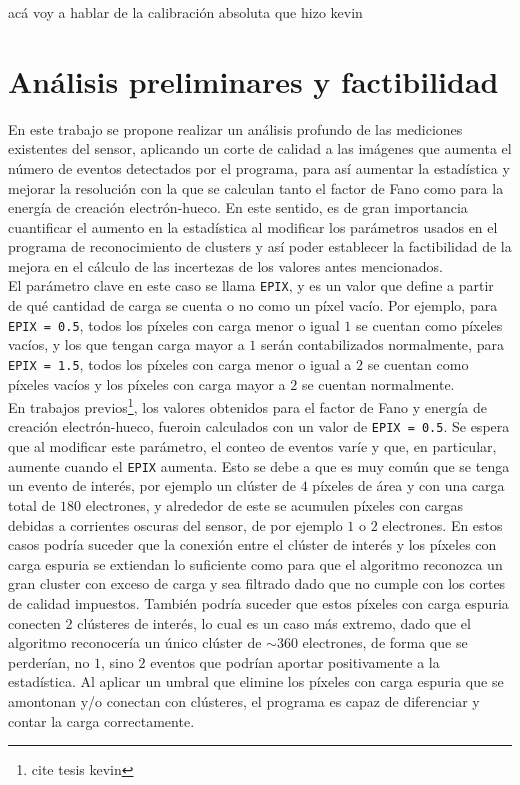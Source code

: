 acá voy a hablar de la calibración absoluta que hizo kevin




\chapter{Análisis preliminares y factibilidad}
\noindent En este trabajo se propone realizar un análisis profundo de las mediciones existentes del sensor, aplicando un corte de calidad a las imágenes que aumenta el número de eventos detectados por el programa, para así aumentar la estadística y mejorar la resolución con la que se calculan tanto el factor de Fano como para la energía de creación electrón-hueco. %
En este sentido, es de gran importancia cuantificar el aumento en la estadística al modificar los parámetros usados en el programa de reconocimiento de clusters y así poder establecer la factibilidad de la mejora en el cálculo de las incertezas de los valores antes mencionados.\\
\indent El parámetro clave en este caso se llama \verb|EPIX|, y es un valor que define a partir de qué cantidad de carga se cuenta o no como un píxel vacío. Por ejemplo, para \verb|EPIX = 0.5|, todos los píxeles con carga menor o igual $1$ se cuentan como píxeles vacíos, y los que tengan carga mayor a $1$ serán contabilizados normalmente, para \verb|EPIX = 1.5|, todos los píxeles con carga menor o igual a $2$ se cuentan como píxeles vacíos y los píxeles con carga mayor a $2$ se cuentan normalmente.\\
\indent En trabajos previos\footnote{cite tesis kevin}, los valores obtenidos para el factor de Fano y energía de creación electrón-hueco, fueroin calculados con un valor de \verb|EPIX = 0.5|. Se espera que al modificar este parámetro, el conteo de eventos varíe y que, en particular, aumente cuando el \verb|EPIX| aumenta. Esto se debe a que es muy común que se tenga un evento de interés, por ejemplo un clúster de $4$ píxeles de área y con una carga total de $180$ electrones, y alrededor de este se acumulen píxeles con cargas debidas a corrientes oscuras del sensor, de por ejemplo $1$ o $2$ electrones. En estos casos podría suceder que la conexión entre el clúster de interés y los píxeles con carga espuria se extiendan lo suficiente como para que el algoritmo reconozca un gran cluster con exceso de carga y sea filtrado dado que no cumple con los cortes de calidad impuestos. También podría suceder que estos píxeles con carga espuria conecten $2$ clústeres de interés, lo cual es un caso más extremo, dado que el algoritmo reconocería un único clúster de $\sim 360$ electrones, de forma que se perderían, no $1$, sino $2$ eventos que podrían aportar positivamente a la estadística. Al aplicar un umbral que elimine los píxeles con carga espuria que se amontonan y/o conectan con clústeres, el programa es capaz de diferenciar y contar la carga correctamente.\\
